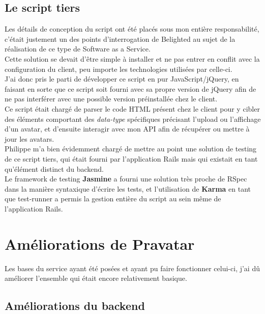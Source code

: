 \documentclass{report}
\begin{document}
    \subsection{Le script tiers}
    \label{subs:Le script tiers}

      Les détails de conception du script ont été placés sous mon entière responsabilité, c'était justement un des points d'interrogation de Belighted au sujet de la réalisation de ce type de Software as
      a Service.\\
      Cette solution se devait d'être simple à installer et ne pas entrer en conflit avec la configuration du client, peu importe les technologies utilisées par celle-ci.\\

      J'ai donc pris le parti de développer ce script en pur JavaScript/jQuery, en faisant en sorte que ce script soit fourni avec sa propre version de jQuery afin de ne pas interférer avec une
      possible version préinstallée chez le client.\\
      Ce script était chargé de parser le code HTML présent chez le client pour y cibler des éléments comportant des \textit{data-type} spécifiques précisant l'upload ou l'affichage d'un avatar, et d'ensuite
      interagir avec mon API afin de récupérer ou mettre à jour les avatars.\\

      Philippe m'a bien évidemment chargé de mettre au point une solution de testing de ce script tiers, qui était fourni par l'application Rails mais qui existait en tant qu'élément distinct du backend.\\
      Le framework de testing \textbf{Jasmine} a fourni une solution très proche de RSpec dans la manière syntaxique d'écrire les tests, et l'utilisation de \textbf{Karma} en tant que test-runner a
      permis la gestion entière du script au sein même de l'application Rails.\\

  \section{Améliorations de Pravatar}
  \label{sec:Améliorations de Pravatar}

    Les bases du service ayant été posées et ayant pu faire fonctionner celui-ci, j'ai dû améliorer l'ensemble qui était encore relativement basique.\\

    \subsection{Améliorations du backend}
    \label{subs:Améliorations du backend}
\end{document}
